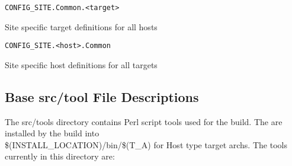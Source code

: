 \begin{description}
\end{description}\begin{verbatim}CONFIG_SITE.Common.<target>
\end{verbatim}\begin{description}\item Site specific target definitions for all hosts

\end{description}\begin{verbatim}CONFIG_SITE.<host>.Common
\end{verbatim}\begin{description}\item Site specific host definitions for all targets

\end{description}\subsection{Base src/tool File Descriptions}

The src/tools directory contains Perl script tools used for the build. The are installed by the build into \\
\$(INSTALL\_LOCATION)/bin/\$(T\_A) for Host type target archs. The tools currently in this directory are:

